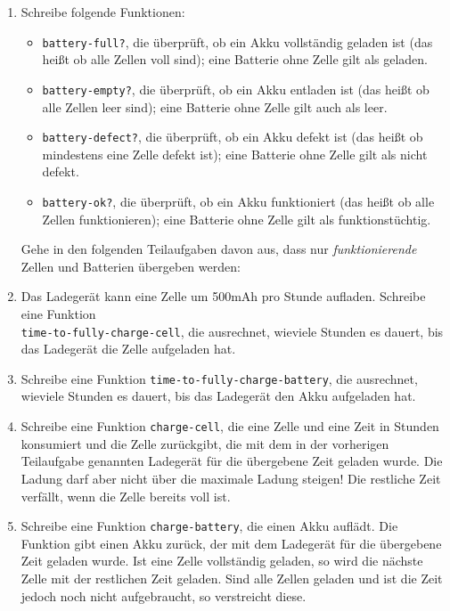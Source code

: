 \begin{aufgabe}
\begin{enumerate}
  \item Schreibe folgende Funktionen:

    \begin{itemize}
    \item \lstinline{battery-full?}, die überprüft, ob ein Akku
      vollständig geladen ist (das heißt ob alle Zellen voll sind); eine
      Batterie ohne Zelle gilt als geladen.

    \item \lstinline{battery-empty?}, die überprüft, ob ein Akku entladen
      ist (das heißt ob alle Zellen leer sind); eine Batterie ohne Zelle
      gilt auch als leer.

    \item \lstinline{battery-defect?}, die überprüft, ob ein Akku defekt
      ist (das heißt ob mindestens eine Zelle defekt ist); eine Batterie
      ohne Zelle gilt als nicht defekt.

    \item \lstinline{battery-ok?}, die überprüft, ob ein Akku
      funktioniert (das heißt ob alle Zellen funktionieren); eine Batterie
      ohne Zelle gilt als funktionstüchtig.
      
    \end{itemize}

    Gehe in den folgenden Teilaufgaben davon aus, dass
      nur \emph{funktionierende} Zellen und Batterien übergeben
      werden:

  \item Das Ladegerät kann eine Zelle um 500mAh pro Stunde
    aufladen.  Schreibe eine Funktion \\
    \lstinline{time-to-fully-charge-cell}, die ausrechnet, wieviele
    Stunden es dauert, bis das Ladegerät die Zelle aufgeladen hat.

  \item Schreibe eine Funktion
    \lstinline{time-to-fully-charge-battery}, die ausrechnet, wieviele
    Stunden es dauert, bis das Ladegerät den Akku aufgeladen hat.

  \item Schreibe eine Funktion \lstinline{charge-cell}, die eine
    Zelle und eine Zeit in Stunden konsumiert und die Zelle
    zurückgibt, die mit dem in der vorherigen Teilaufgabe genannten
    Ladegerät für die übergebene Zeit geladen wurde.  Die Ladung darf
    aber nicht über die maximale Ladung steigen!  Die restliche Zeit
    verfällt, wenn die Zelle bereits voll ist.

  \item Schreibe eine Funktion \lstinline{charge-battery}, die einen
    Akku auflädt.  Die Funktion gibt einen Akku zurück, der mit dem
    Ladegerät für die übergebene Zeit geladen wurde.  Ist eine Zelle
    vollständig geladen, so wird die nächste Zelle mit der restlichen
    Zeit geladen.  Sind alle Zellen geladen und ist die Zeit jedoch
    noch nicht aufgebraucht, so verstreicht diese.


\end{enumerate}
\end{aufgabe}
